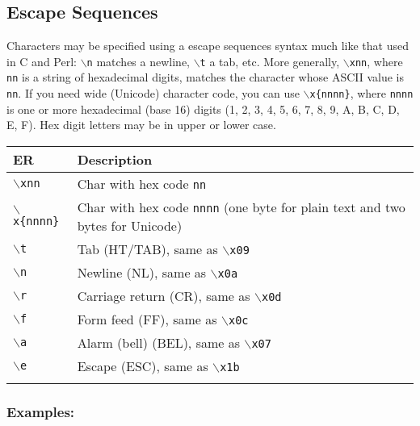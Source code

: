 \subsection{Escape Sequences}

Characters may be specified using a escape sequences syntax much like that
used in C and Perl: \texttt{$\backslash$n} matches a newline,
\texttt{$\backslash$t} a tab, etc. More generally, \texttt{$\backslash$xnn},
where \texttt{nn} is a string of hexadecimal digits, matches the character
whose ASCII value is \texttt{nn}. If you need wide (Unicode) character code,
you can use \texttt{$\backslash$x\{nnnn\}}, where \texttt{nnnn} is one or
more hexadecimal (base 16) digits (1, 2, 3, 4, 5, 6, 7, 8, 9, A, B, C, D, E, F).
Hex digit letters may be in upper or lower case.

\begin{footnotesize}
  \begin{tabularx}{\textwidth}{>{\hsize=0.3\hsize}X>{\hsize=0.7\hsize}X}\\
    \hline
    \textbf{ER} & \textbf{Description} \\
    \hline
    \texttt{$\backslash$xnn} & Char with hex code \texttt{nn} \\
    \texttt{$\backslash$x\{nnnn\}} & Char with hex code \texttt{nnnn} (one byte for plain text and two bytes for Unicode) \\
    \texttt{$\backslash$t} & Tab (HT/TAB), same as \texttt{$\backslash$x09} \\
    \texttt{$\backslash$n} & Newline (NL), same as \texttt{$\backslash$x0a} \\
    \texttt{$\backslash$r} & Carriage return (CR), same as \texttt{$\backslash$x0d} \\
    \texttt{$\backslash$f} & Form feed (FF), same as \texttt{$\backslash$x0c} \\
    \texttt{$\backslash$a} & Alarm (bell) (BEL), same as \texttt{$\backslash$x07} \\
    \texttt{$\backslash$e} & Escape (ESC), same as \texttt{$\backslash$x1b} \\
    \hline
    \\
  \end{tabularx}
\end{footnotesize}


\subsubsection{Examples:}


